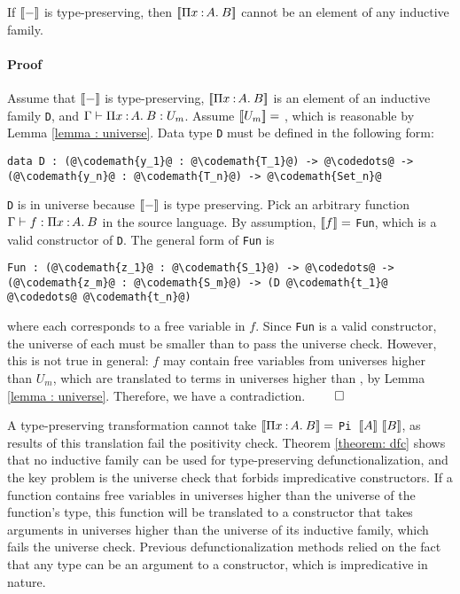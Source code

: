 \begin{theorem} If ${[\![ - ]\!]}$ is type-preserving, then ${[\![ \Pi x\mkern1.5mu{\hspace{0.5mm}{:}\hspace{0.5mm}} A.\hspace{0.8mm}B ]\!]}$ cannot be an element of any inductive family.
\paragraph{Proof} 
Assume that ${[\![ - ]\!]}$ is type-preserving, ${[\![ \Pi x\mkern1.5mu{\hspace{0.5mm}{:}\hspace{0.5mm}} A.\hspace{0.8mm}B ]\!]}$ is an element of an inductive family \texttt{D}, and $\Gamma \vdash \Pi x\mkern1.5mu{\hspace{0.5mm}{:}\hspace{0.5mm}} A.\hspace{0.8mm}B : U_m$. Assume ${[\![ U_m ]\!]} =$ , which is reasonable by Lemma \ref{lemma : universe}. Data type \texttt{D} must be defined in the following form:
\begin{lstlisting}[escapechar=@]
data D : (@\codemath{y_1}@ : @\codemath{T_1}@) -> @\codedots@ -> (@\codemath{y_n}@ : @\codemath{T_n}@) -> @\codemath{Set_n}@
\end{lstlisting}
\texttt{D} is in universe  because ${[\![ - ]\!]}$ is type preserving.
Pick an arbitrary function $\Gamma \vdash f : \Pi x\mkern1.5mu{\hspace{0.5mm}{:}\hspace{0.5mm}} A.\hspace{0.8mm}B$ in the source language. By assumption, ${[\![ f ]\!]} =$ \texttt{Fun}, which is a valid constructor of \texttt{D}. The general form of \texttt{Fun} is
\begin{lstlisting}[escapechar=@]
Fun : (@\codemath{z_1}@ : @\codemath{S_1}@) -> @\codedots@ -> (@\codemath{z_m}@ : @\codemath{S_m}@) -> (D @\codemath{t_1}@ @\codedots@ @\codemath{t_n}@)
\end{lstlisting}
where each  corresponds to a free variable in $f$. Since \texttt{Fun} is a valid constructor, the universe of each  must be smaller than  to pass the universe check. However, this is not true in general: $f$ may contain free variables from universes higher than $U_m$, which are translated to terms in universes higher than , by Lemma \ref{lemma : universe}. Therefore, we have a contradiction. $\qed$
\label{theorem: dfc}
\end{theorem}

A type-preserving transformation cannot take ${[\![ \Pi x\mkern1.5mu{\hspace{0.5mm}{:}\hspace{0.5mm}} A.\hspace{0.8mm}B ]\!]} =$ \texttt{Pi }$\bbracket{A}\ \bbracket{B}$, as results of this translation fail the positivity check. Theorem \ref{theorem: dfc} shows that no inductive family can be used for type-preserving defunctionalization, and the key problem is the universe check that forbids impredicative constructors. If a function contains free variables in universes higher than the universe of the function's type, this function will be translated to a constructor that takes arguments in universes higher than the universe of its inductive family, which fails the universe check. Previous defunctionalization methods relied on the fact that any type can be an argument to a constructor, which is impredicative in nature.



